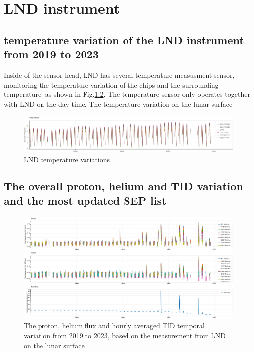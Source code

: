 \chapter{LND instrument}
\label{chp:GCS_Python}

\section{temperature variation of the LND instrument from 2019 to 2023}

Inside of the sensor head, LND has several temperature measusment sensor, monitoring the temperature variation of the chips and the surrounding temperature, as shown in Fig.\ref{}. The temperature sensor only operates together with LND on the day time. 
The temperature variation on the lunar surface

\begin{figure}
    \centering
    \includegraphics[angle = 90, width = \textwidth, height = \textheight]{images/lnd_temperature.png}
    \caption{LND temperature variations}
    \label{}
\end{figure}

\section{The overall proton, helium and TID variation and the most updated SEP list}

\begin{figure}
    \centering
    \includegraphics[angle = 90, width = 0.9\textheight, height = 0.8\textwidth]{images/LND-proton-helium-TID.png}
    \caption[The overview variation of proton and helium flux and \ac{TID}]{The proton, helium flux and hourly averaged \ac{TID} temporal variation from 2019 to 2023, based on the measurement from \ac{LND} on the lunar surface}
    \label{Fig:appendix_LND_proton_helium_TID}
\end{figure}

